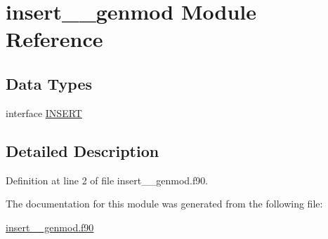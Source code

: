 \hypertarget{classinsert____genmod}{\section{insert\+\_\+\+\_\+genmod Module Reference}
\label{classinsert____genmod}
}
\subsection*{Data Types}
\begin{DoxyCompactItemize}
\item 
interface \hyperlink{interfaceinsert____genmod_1_1INSERT}{I\+N\+S\+E\+R\+T}
\end{DoxyCompactItemize}


\subsection{Detailed Description}


Definition at line 2 of file insert\+\_\+\+\_\+genmod.\+f90.



The documentation for this module was generated from the following file\+:\begin{DoxyCompactItemize}
\item 
\hyperlink{insert____genmod_8f90}{insert\+\_\+\+\_\+genmod.\+f90}\end{DoxyCompactItemize}
